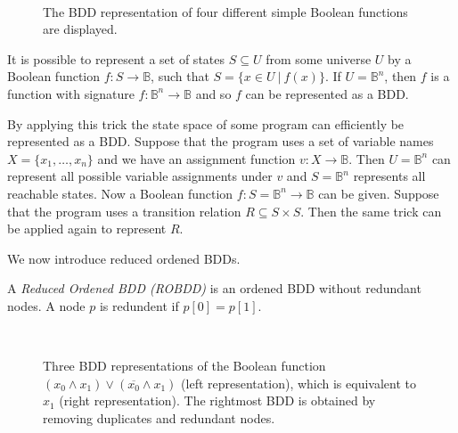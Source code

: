 \begin{figure}
	\centering
	\subfloat[$x$] {
		
		$\vspace{360pt}$
	}
	$\hspace{36pt}$
	\subfloat[$\neg x$] {
		
	}
	$\hspace{36pt}$
	\subfloat[$x_0 \wedge x_1$] {
		
	}
	$\hspace{36pt}$
	\subfloat[$x_0 \vee x_1$] {
		
	}
	
	\caption{The BDD representation of four different simple Boolean functions are displayed.}
	\label{fig:bdd_examples}
\end{figure}

It is possible to represent a set of states $S \subseteq U$ from some universe $U$ by a Boolean function $f : S \rightarrow \mathbb{B}$, such that $S = \{ x \in U \ | \ f(x) \}$. If $U = \mathbb{B}^n$, then $f$ is a function with signature $f : \mathbb{B}^n \rightarrow \mathbb{B}$ and so $f$ can be represented as a BDD. 

By applying this trick the state space of some program can efficiently be represented as a BDD. Suppose that the program uses a set of variable names $X = \{ x_1, \dots, x_n \}$ and we have an assignment function $v : X \rightarrow \mathbb{B}$. Then $U = \mathbb{B}^n$ can represent all possible variable assignments under $v$ and $S = \mathbb{B}^n$ represents all reachable states. Now a Boolean function $f : S = \mathbb{B}^n \rightarrow \mathbb{B}$ can be given. Suppose that the program uses a transition relation $R \subseteq S \times S$. Then the same trick can be applied again to represent $R$.

We now introduce reduced ordened BDDs.

\begin{definition}
	A \emph{Reduced Ordened BDD (ROBDD)} is an ordened BDD without redundant nodes. A node $p$ is redundent if $p[0] = p[1]$.
\end{definition}

\begin{figure}
	\centering
	$\hspace{36pt}$
	$\hspace{36pt}$
	
	\caption{Three BDD representations of the Boolean function $(x_0 \wedge x_1) \vee (\overline{x_0} \wedge x_1)$ (left representation), which is equivalent to $x_1$ (right representation). The rightmost BDD is obtained by removing duplicates and redundant nodes.}
	\label{fig:bdd_reductions}
\end{figure}

